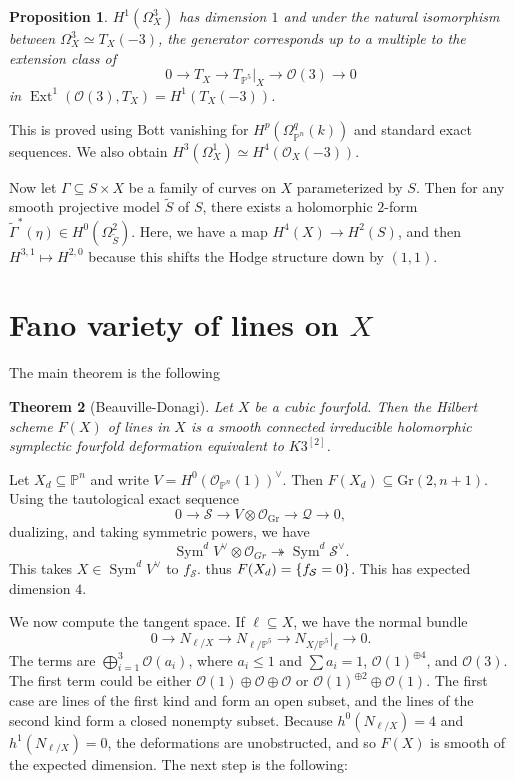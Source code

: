 \documentclass[leqno, openany]{memoir}
\newtheorem{thm}{Theorem}[section]
\newtheorem{prop}[thm]{Proposition}
\theoremstyle{definition}
\theoremstyle{remark}
\theoremstyle{plain}
\theoremstyle{definition}
\theoremstyle{remark}
\renewcommand{\P}{\mathbb{P}}
\newcommand{\mc}[1]{\mathcal{#1}}
\newcommand{\mr}[1]{\mathrm{#1}}
\newcommand{\on}[1]{\operatorname{#1}}
\newcommand{\wt}[1]{\widetilde{#1}}
\DeclareMathOperator{\Ext}{Ext}
\begin{document}
\begin{prop}
    $H^1(\Omega^3_X)$ has dimension $1$ and under the natural isomorphism between $\Omega^3_X \simeq T_X(-3)$, the generator corresponds up to a multiple to the extension class of
    \[ 0 \to T_X \to T_{\P^5}|_X \to \mc{O}(3) \to 0 \]
    in $\Ext^1(\mc{O}(3), T_X) = H^1(T_X(-3))$.
\end{prop}

This is proved using Bott vanishing for $H^p(\Omega^q_{\P^n}(k))$ and standard exact sequences. We also obtain $H^3(\Omega_X^1) \simeq H^4(\mc{O}_X(-3))$.

Now let $\Gamma \subseteq S \times X$ be a family of curves on $X$ parameterized by $S$. Then for any smooth projective model $\wt{S}$ of $S$, there exists a holomorphic $2$-form $\wt{\Gamma}^*(\eta) \in H^0(\Omega^2_{\wt{S}})$. Here, we have a map $H^4(X) \to H^2(S)$, and then $H^{3,1} \mapsto H^{2,0}$ because this shifts the Hodge structure down by $(1,1)$.


\section{Fano variety of lines on $X$}%
\label{sec:fano_variety_of_lines_on_x_}

The main theorem is the following
\begin{thm}[Beauville-Donagi]
    Let $X$ be a cubic fourfold. Then the Hilbert scheme $F(X)$ of lines in $X$ is a smooth connected irreducible holomorphic symplectic fourfold deformation equivalent to $K3^{[2]}$.
\end{thm}

Let $X_d \subseteq \P^n$ and write $V = H^0(\mc{O}_{\P^n}(1))^{\vee}$. Then $F(X_d) \subseteq \mr{Gr}(2, n+1)$. Using the tautological exact sequence
\[ 0 \to \mc{S} \to V \otimes \mc{O}_{\mr{Gr}} \to \mc{Q} \to 0, \]
dualizing, and taking symmetric powers, we have
\[ \on{Sym}^d V^{\vee} \otimes \mc{O}_{Gr} \twoheadrightarrow \on{Sym}^d \mc{S}^{\vee}. \]
This takes $X \in \on{Sym}^d V^{\vee}$ to $f_{\mc{S}}$. thus $F(X_d) = \qty{f_{\mc{S}} = 0}$. This has expected dimension $4$.

We now compute the tangent space. If $\ell \subseteq X$, we have the normal bundle
\[ 0 \to N_{\ell/X} \to N_{\ell/\P^5} \to N_{X/\P^5}|_{\ell} \to 0. \]
The terms are $\bigoplus_{i=1}^3 \mc{O}(a_i)$, where $a_i \leq 1$ and $\sum a_i = 1$, $\mc{O}(1)^{\oplus 4}$, and $\mc{O}(3)$. The first term could be either $\mc{O}(1) \oplus \mc{O} \oplus \mc{O}$ or $\mc{O}(1)^{\oplus 2} \oplus \mc{O}(1)$. The first case are lines of the first kind and form an open subset, and the lines of the second kind form a closed nonempty subset. Because $h^0(N_{\ell/X}) = 4$ and $h^1(N_{\ell/X}) = 0$, the deformations are unobstructed, and so $F(X)$ is smooth of the expected dimension. The next step is the following:
\end{document}
